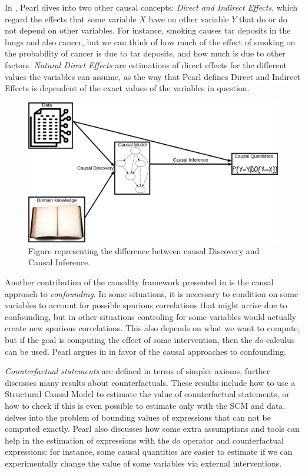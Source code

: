 In \cite[Section~4.5]{Causality}, Pearl dives into two other causal concepts: \emph{Direct and Indirect Effects}, which regard the effects that some variable $X$ have on other variable $Y$ that do or do not depend on other variables. For instance, smoking causes tar deposits in the lungs and also cancer, but we can think of how much of the effect of smoking on the probability of cancer is due to tar deposits, and how much is due to other factors. \emph{Natural Direct Effects} are  estimations of direct effects for the different values the variables can assume, as the way that Pearl defines Direct and Indirect Effects is dependent of the exact values of the variables in question.

\begin{figure}[ht]
\centering
\includegraphics[width=\textwidth]{discInf}
\caption{Figure representing the difference between causal Discovery and Causal Inference.}\label{fig:discInf}
\end{figure}

Another contribution of the causality framework presented in \cite{Causality} is the causal approach to \emph{confounding}. In some situations, it is necessary to condition on some variables to account for possible spurious correlations that might arrise due to confounding, but in other situations controling for some variables would actually create new spurious correlations. This also depends on what we want to compute, but if the goal is computing the effect of some intervention, then the $do$-calculus can be used. Pearl argues in \cite[Chapter~6]{Causality} in favor of the causal approaches to confounding.

\emph{Counterfactual statements} are defined in terms of simpler axioms, \cite[Chapter~7]{Causality} further discusses many results about counterfactuals. These results include how to use a Structural Causal Model to estimate the value of counterfactual statements, or how to check if this is even possible to estimate only with the SCM and data. \cite[Chapter~8]{Causality} delves into the problem of bounding values of expressions that can not be computed exactly. Pearl also discusses how some extra assumptions and tools can help in the estimation of expressions with the $do$ operator and counterfactual expressions: for instance, some causal quantities are easier to estimate if we can experimentally change the value of some variables via external interventions.

